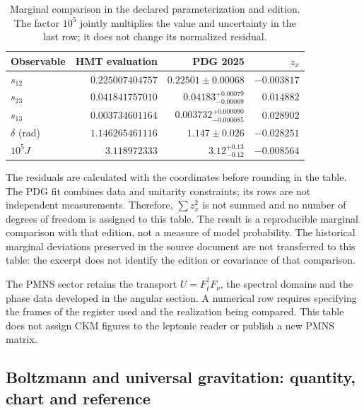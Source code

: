 \begin{table}[htbp]
\centering\small
\setlength{\tabcolsep}{4pt}
\begin{tabular}{@{}lrrr@{}}
\toprule
Observable & HMT evaluation & PDG 2025 & \(z_x\)\\
\midrule
\(s_{12}\) & \(0.225007404757\) & \(0.22501\pm0.00068\) & \(-0.003817\)\\
\(s_{23}\) & \(0.041841757010\) & \(0.04183^{+0.00079}_{-0.00069}\) & \(0.014882\)\\
\(s_{13}\) & \(0.003734601164\) & \(0.003732^{+0.000090}_{-0.000085}\) & \(0.028902\)\\
\(\delta\) (rad) & \(1.146265461116\) & \(1.147\pm0.026\) & \(-0.028251\)\\
\(10^5J\) & \(3.118972333\) & \(3.12^{+0.13}_{-0.12}\) & \(-0.008564\)\\
\bottomrule
\end{tabular}
\caption{Marginal comparison in the declared parameterization and edition.
The factor \(10^5\) jointly multiplies the value and uncertainty in the
last row; it does not change its normalized residual.}
\label{ii:tab:ii-ckm-comparacion}
\end{table}

The residuals are calculated with the coordinates before rounding
in the table. The PDG fit combines data and unitarity constraints;
its rows are not independent measurements. Therefore,
\(\sum z_x^2\) is not summed and no number of degrees of freedom is assigned to this table.
The result is a reproducible marginal comparison with that edition,
not a measure of model probability. The historical marginal deviations
preserved in the source document are not transferred to this table:
the excerpt does not identify the edition or covariance of that comparison.

The PMNS sector retains the transport \(U=F_\ell^\dagger F_\nu\), the
spectral domains and the phase data developed in the angular
section. A numerical row requires specifying the frames of the register
used and the realization being compared. This table does not assign CKM figures
to the leptonic reader or publish a new PMNS matrix.

\subsection{Boltzmann and universal gravitation: quantity, chart and reference}

